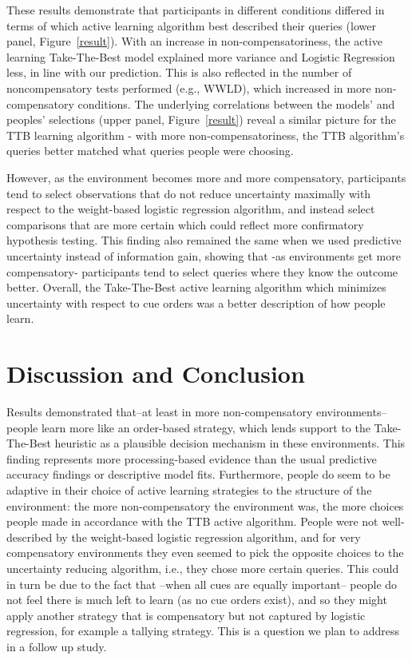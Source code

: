 \documentclass[10pt,letterpaper]{article}
\begin{document}
These results demonstrate that participants in different conditions differed in terms of which active learning algorithm best described their queries (lower panel, Figure~\ref{result}). With an increase in non-compensatoriness, the active learning Take-The-Best model explained more variance and Logistic Regression less, in line with our prediction. This is also reflected in the number of noncompensatory tests performed (e.g., WWLD), which increased in more non-compensatory conditions. The underlying correlations between the models' and peoples' selections (upper panel, Figure~\ref{result}) reveal a similar picture for the TTB learning algorithm - with more non-compensatoriness, the TTB algorithm's queries better matched what queries people were choosing. 

However, as the environment becomes more and more compensatory, participants tend to select observations that do not reduce uncertainty maximally with respect to the weight-based logistic regression algorithm, and instead select comparisons that are more certain which could reflect more confirmatory hypothesis testing. This finding also remained the same when we used predictive uncertainty instead of information gain, showing that -as environments get more compensatory- participants tend to select queries where they know the outcome better. Overall, the Take-The-Best active learning algorithm which minimizes uncertainty with respect to cue orders was a better description of how people learn.
\section{Discussion and Conclusion}
Results demonstrated that--at least in more non-compensatory environments-- people learn more like an order-based strategy, which lends support to the Take-The-Best heuristic as a plausible decision mechanism in these environments. This finding represents more processing-based evidence than the usual predictive accuracy findings or descriptive model fits.  Furthermore, people do seem to be adaptive in their choice of active learning strategies to the structure of the environment: the more non-compensatory the environment was, the more choices people made in accordance with the TTB active algorithm. People were not well-described by the weight-based logistic regression algorithm, and for very compensatory environments they even seemed to pick the opposite choices to the uncertainty reducing algorithm, i.e., they chose more certain queries. This could in turn be due to the fact that --when all cues are equally important-- people do not feel there is much left to learn (as no cue orders exist), and so they might apply another strategy that is compensatory but not captured by logistic regression, for example a tallying strategy. This is a question we plan to address in a follow up study.\\
\end{document}
